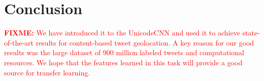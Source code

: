 \documentclass[sigconf,anonymous,review]{acmart}
\newcommand{\ignore}[1]{}
\newcommand{\fixme}[1]{\textcolor{red}{\textbf{FIXME:} {#1}}}
\newcommand{\uniloc}{\textsc{UniLoc}}
\begin{document}
\section{Conclusion}

\fixme{
We have introduced it to the UnicodeCNN and used it to achieve state-of-the-art results for content-based tweet geolocation.
A key reason for our good results was the large dataset of 900 million labeled tweets and computational resources.
We hope that the features learned in this task will provide a good source for transfer learning.
}

\ignore{
\section{Visualization}

A major disadvantage of CNNs is that they lack interpretability compared to simpler models.
To alleviate this problem, many techniques have been proposed to visualize CNNs in the context of image classification \citep{zeiler2014visualizing,seifert2017visualizations}.
We adapt these methods to provide the first visualization method of CNNs applicable to the text domain.
This visualization technique helps us understand the dialectical patterns that \uniloc~CNN discovers in the text.

The method is simple and inspired by the occlusion method proposed by \citet{zeiler2014visualizing} for visualizing image CNNs.
Given an input text with $n$ characters,
we generate $n-1$ new texts by removing the $i$th character from the original text.
}

\end{document}
